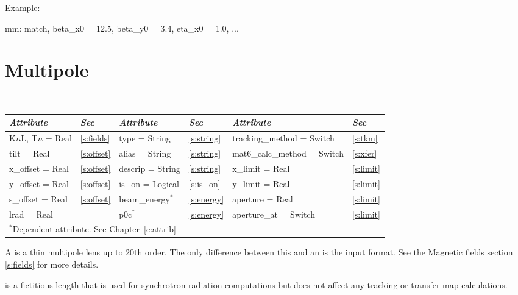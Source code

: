 {{Example:
\begin{example}
  mm: match, beta_x0 = 12.5, beta_y0 = 3.4, eta_x0 = 1.0, ...
\end{example}

\section{Multipole}
\label{s:mult}

\begin{center}
\tt
\begin{tabular}{|l|l||l|l||l|l|} \hline
  {\sl Attribute} & {\sl Sec}  & {\sl Attribute} & {\sl Sec} & {\sl Attribute} & {\sl Sec} \\ \hline
  K$n$L, T$n$ = Real &  \ref{s:fields} &  type = String       & \ref{s:string} & tracking\_method = Switch   & \ref{s:tkm}   \\ \hline
  tilt       = Real  &  \ref{s:offset} &  alias = String      & \ref{s:string} & mat6\_calc\_method = Switch & \ref{s:xfer}  \\ \hline
  x\_offset  = Real  &  \ref{s:offset} &  descrip = String    & \ref{s:string} & x\_limit = Real             & \ref{s:limit} \\ \hline
  y\_offset  = Real  &  \ref{s:offset} &  is\_on = Logical    & \ref{s:is_on}  & y\_limit = Real             & \ref{s:limit} \\ \hline
  s\_offset  = Real  &  \ref{s:offset} &  beam\_energy$^*$    & \ref{s:energy} & aperture = Real             & \ref{s:limit} \\ \hline
  lrad       = Real  &                 &  p0c$^*$             & \ref{s:energy} & aperture\_at = Switch       & \ref{s:limit} \\ \hline
  \multicolumn{6}{l}{\small $^*$Dependent attribute. See Chapter~\ref{c:attrib}} \\
\end{tabular}
\end{center}
\toffset

A  is a thin multipole lens up to 20th order. The only
difference between this and an  is the input format. See the 
Magnetic fields section \ref{s:fields} for more details.

 is a fictitious length that is used for synchrotron radiation
computations but does not affect any tracking or transfer map calculations. 

}}
